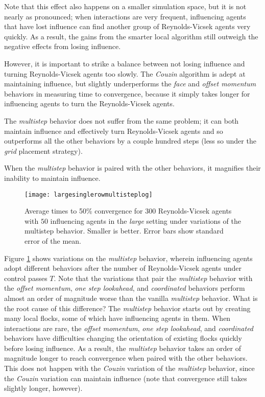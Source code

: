Note that this effect also happens on a smaller simulation space, but it is
not nearly as pronounced; when interactions are very frequent, influencing
agents that have lost influence can find another group of Reynolds-Vicsek
agents very quickly.
As a result, the gains from the smarter local algorithm still outweigh the
negative effects from losing influence.

However, it is important to strike a balance between not losing influence and
turning Reynolds-Vicsek agents too slowly.
The \textit{Couzin} algorithm is adept at maintaining influence, but slightly
underperforms the \textit{face} and \textit{offset momentum} behaviors in
measuring time to convergence, because it simply takes longer for influencing
agents to turn the Reynolds-Vicsek agents.

The \textit{multistep} behavior does not suffer from the same problem; it
can both maintain influence and effectively turn Reynolds-Vicsek agents and so
outperforms all the other behaviors by a couple hundred steps (less so under
the \textit{grid} placement strategy).

When the \textit{multistep} behavior is paired with the other behaviors,
it magnifies their inability to maintain influence.
\begin{figure}
    \texttt{[image: largesinglerowmultisteplog]}
    \caption{Average times to 50\% convergence for $300$ Reynolds-Vicsek agents
    with $50$ influencing agents in the \textit{large} setting under variations
    of the multistep behavior.
    Smaller is better.
    Error bars show standard error of the mean.}
    \label{fig:largemultistep}
\end{figure}
Figure \ref{fig:largemultistep} shows variations on the \textit{multistep}
behavior, wherein influencing agents adopt different behaviors after the number
of Reynolds-Vicsek agents under control passes $T$.
Note that the variations that pair the \textit{multistep} behavior with the
\textit{offset momentum}, \textit{one step lookahead}, and \textit{coordinated}
behaviors perform almost an order of magnitude worse than the vanilla
\textit{multistep} behavior.
What is the root cause of this difference?
The \textit{multistep} behavior starts out by creating many local flocks, some
of which have influencing agents in them.
When interactions are rare, the \textit{offset momentum}, \textit{one step
lookahead}, and \textit{coordinated} behaviors have difficulties changing the
orientation of existing flocks quickly before losing influence.
As a result, the \textit{multistep} behavior takes an order of magnitude longer
to reach convergence when paired with the other behaviors.
This does not happen with the \textit{Couzin} variation of the
\textit{multistep} behavior, since the \textit{Couzin} variation can maintain
influence (note that convergence still takes slightly longer, however).

